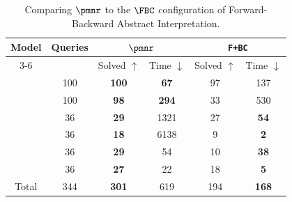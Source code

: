 \begin{table}[htb]
    \centering
	\caption{Comparing \(\pmnr\) to the \(\FBC\) configuration of Forward-Backward Abstract Interpretation.}
	\begin{tabular}{|c|c|cc|cc|}
		\hline
		\multirow{2}{*}{Model}                   & \multirow{2}{*}{Queries}       &
		\multicolumn{2}{c|}{\(\pmnr\)} & \multicolumn{2}{c|}{\texttt{F+BC}}                                                                                                                                         \\ \cline{3-6}
		                                         &                                & \multicolumn{1}{c|}{Solved \(\uparrow\)} & Time \(\downarrow\) & \multicolumn{1}{c|}{Solved \(\uparrow\)} & Time \(\downarrow\) \\ \hline
		\LeakyReluFive                           & 100                            & \multicolumn{1}{c|}{\textbf{100}}        & \textbf{67}         & \multicolumn{1}{c|}{97}                  & 137                 \\ \hline
		\LeakyReluEight                          & 100                            & \multicolumn{1}{c|}{\textbf{98}}         & \textbf{294}        & \multicolumn{1}{c|}{33}                  & 530                 \\ \hline
		\LeakyReluFourteen                       & 36                             & \multicolumn{1}{c|}{\textbf{29}}         & 1321                & \multicolumn{1}{c|}{27}                  & \textbf{54}         \\ \hline
		\ReluSignMax                             & 36                             & \multicolumn{1}{c|}{\textbf{18}}         & 6138                & \multicolumn{1}{c|}{9}                   & \textbf{2}          \\ \hline
		\ReluBilinearSoftmax                     & 36                             & \multicolumn{1}{c|}{\textbf{29}}         & 54                  & \multicolumn{1}{c|}{10}                  & \textbf{38}         \\ \hline
		\LeakyReluSigmoid                        & 36                             & \multicolumn{1}{c|}{\textbf{27}}         & 22                  & \multicolumn{1}{c|}{18}                  & \textbf{5}          \\ \hline
		Total                                    & 344                            & \multicolumn{1}{c|}{\textbf{301}}        & 619                 & \multicolumn{1}{c|}{194}                 & \textbf{168}        \\ \hline
	\end{tabular}
	\label{tab:results-forward-backward}
\end{table}